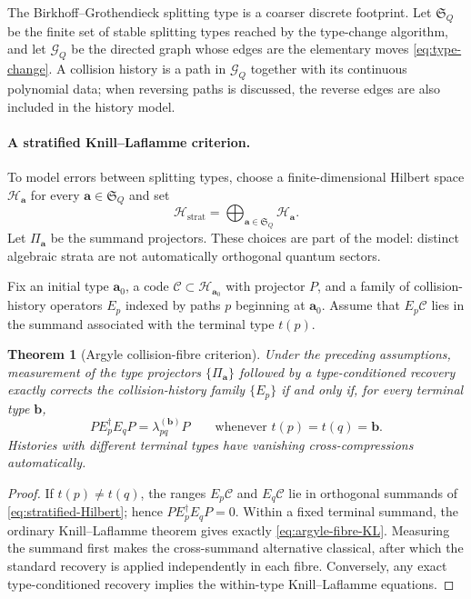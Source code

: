 \documentclass[11pt]{article}
\newtheorem{theorem}{Theorem}[section]
\theoremstyle{definition}
\theoremstyle{remark}
\newcommand{\cH}{\mathcal H}
\newcommand{\cC}{\mathcal C}
\newcommand{\cG}{\mathcal G}
\begin{document}
The Birkhoff--Grothendieck splitting type is a coarser discrete footprint.  Let $\mathfrak S_Q$ be the finite set of stable splitting types reached by the type-change algorithm, and let $\cG_Q$ be the directed graph whose edges are the elementary moves \eqref{eq:type-change}.  A collision history is a path in $\cG_Q$ together with its continuous polynomial data; when reversing paths is discussed, the reverse edges are also included in the history model.

\paragraph{A stratified Knill--Laflamme criterion.}

To model errors between splitting types, choose a finite-dimensional Hilbert space $\cH_{\boldsymbol a}$ for every $\boldsymbol a\in\mathfrak S_Q$ and set
\begin{equation}\label{eq:stratified-Hilbert}
 \cH_{\mathrm{strat}}
 =\bigoplus_{\boldsymbol a\in\mathfrak S_Q}\cH_{\boldsymbol a}.
\end{equation}
Let $\Pi_{\boldsymbol a}$ be the summand projectors.  These choices are part of the model: distinct algebraic strata are not automatically orthogonal quantum sectors.

Fix an initial type $\boldsymbol a_0$, a code $\cC\subset\cH_{\boldsymbol a_0}$ with projector $P$, and a family of collision-history operators $E_p$ indexed by paths $p$ beginning at $\boldsymbol a_0$.  Assume that $E_p\cC$ lies in the summand associated with the terminal type $t(p)$.

\begin{theorem}[Argyle collision-fibre criterion]\label{thm:argyle-fibre-KL}
Under the preceding assumptions, measurement of the type projectors $\{\Pi_{\boldsymbol a}\}$ followed by a type-conditioned recovery exactly corrects the collision-history family $\{E_p\}$ if and only if, for every terminal type $\boldsymbol b$,
\begin{equation}\label{eq:argyle-fibre-KL}
 PE_p^\dagger E_qP=\lambda_{pq}^{(\boldsymbol b)}P
 \qquad
 \text{whenever }t(p)=t(q)=\boldsymbol b.
\end{equation}
Histories with different terminal types have vanishing cross-compressions automatically.
\end{theorem}

\begin{proof}
If $t(p)\neq t(q)$, the ranges $E_p\cC$ and $E_q\cC$ lie in orthogonal summands of \eqref{eq:stratified-Hilbert}; hence $PE_p^\dagger E_qP=0$.  Within a fixed terminal summand, the ordinary Knill--Laflamme theorem gives exactly \eqref{eq:argyle-fibre-KL}.  Measuring the summand first makes the cross-summand alternative classical, after which the standard recovery is applied independently in each fibre.  Conversely, any exact type-conditioned recovery implies the within-type Knill--Laflamme equations.
\end{proof}
\end{document}
